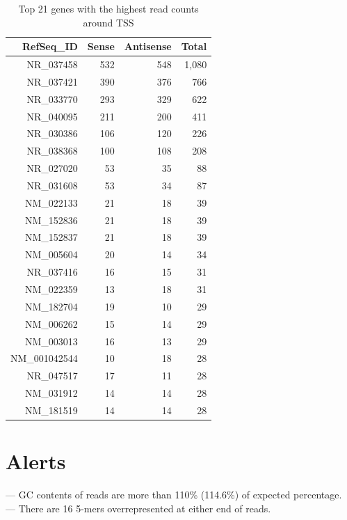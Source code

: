 \documentclass{article}
\begin{document}
{\scriptsize
\begin{longtable}{|r|r|r|r|}
\caption{Top 21 genes with the highest read counts around TSS} \\ 
  \hline
RefSeq\_ID & Sense & Antisense & Total \\ 
  \hline
NR\_037458 & 532 & 548 & 1,080 \\ 
   \rowcolor[gray]{0.9}NR\_037421 & 390 & 376 &   766 \\ 
  NR\_033770 & 293 & 329 &   622 \\ 
   \rowcolor[gray]{0.9}NR\_040095 & 211 & 200 &   411 \\ 
  NR\_030386 & 106 & 120 &   226 \\ 
   \rowcolor[gray]{0.9}NR\_038368 & 100 & 108 &   208 \\ 
  NR\_027020 &  53 &  35 &    88 \\ 
   \rowcolor[gray]{0.9}NR\_031608 &  53 &  34 &    87 \\ 
  NM\_022133 &  21 &  18 &    39 \\ 
   \rowcolor[gray]{0.9}NM\_152836 &  21 &  18 &    39 \\ 
  NM\_152837 &  21 &  18 &    39 \\ 
   \rowcolor[gray]{0.9}NM\_005604 &  20 &  14 &    34 \\ 
  NR\_037416 &  16 &  15 &    31 \\ 
   \rowcolor[gray]{0.9}NM\_022359 &  13 &  18 &    31 \\ 
  NM\_182704 &  19 &  10 &    29 \\ 
   \rowcolor[gray]{0.9}NM\_006262 &  15 &  14 &    29 \\ 
  NM\_003013 &  16 &  13 &    29 \\ 
   \rowcolor[gray]{0.9}NM\_001042544 &  10 &  18 &    28 \\ 
  NR\_047517 &  17 &  11 &    28 \\ 
   \rowcolor[gray]{0.9}NM\_031912 &  14 &  14 &    28 \\ 
  NM\_181519 &  14 &  14 &    28 \\ 
   \hline
\hline
\end{longtable}
}\newpage

\section{Alerts}
 --- GC contents of reads are more than 110\% (114.6\%) of expected percentage. \\ 
  --- There are 16 5-mers overrepresented at either end of reads. \\ 
\end{document}
